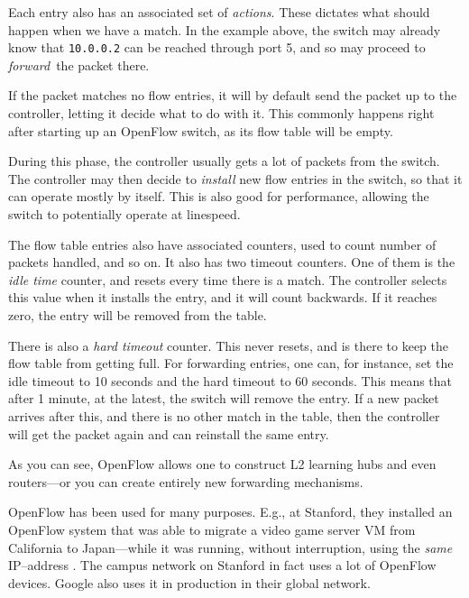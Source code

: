 Each entry also has an associated set of \textit{actions}.  These dictates
what should happen when we have a match.  In the example above, the switch
may already know that \texttt{10.0.0.2} can be reached through port 5, and
so may proceed to \textit{forward} the packet there.

If the packet matches no flow entries, it will by default send the packet up
to the controller, letting it decide what to do with it.  This commonly
happens right after starting up an OpenFlow switch, as its flow table will
be empty.

During this phase, the controller usually gets a lot of packets from the
switch.  The controller may then decide to \textit{install} new flow entries
in the switch, so that it can operate mostly by itself.  This is also good
for performance, allowing the switch to potentially operate at linespeed.

The flow table entries also have associated counters, used to count number
of packets handled, and so on.  It also has two timeout counters.  One of
them is the \textit{idle time} counter, and resets every time there is a
match.  The controller
selects this value when it installs the entry, and it will count backwards.
If it reaches zero, the entry will be removed from the table.

There is also a \textit{hard timeout} counter.  This never resets, and is
there to keep the flow table from getting full.  For forwarding entries, one
can, for instance, set the idle timeout to 10 seconds and the hard timeout
to 60 seconds.  This means that after 1 minute, at the latest, the switch
will remove the entry.  If a new packet arrives after this, and there is no
other match in the table, then the controller will get the packet again and
can reinstall the same entry.

As you can see, OpenFlow allows one to construct L2 learning hubs and even
routers---or you can create entirely new forwarding mechanisms.

OpenFlow has been used for many purposes.  E.g., at Stanford, they installed
an OpenFlow system that was able to migrate a video game server \ac{VM} from
California to Japan---while it was running, without interruption, using the
\textit{same} IP--address \cite{erickson2008demonstration}
\cite{kobayashi2013maturing}.
The campus network on Stanford in fact uses a lot of OpenFlow devices.
Google also uses it in production in their global network.

